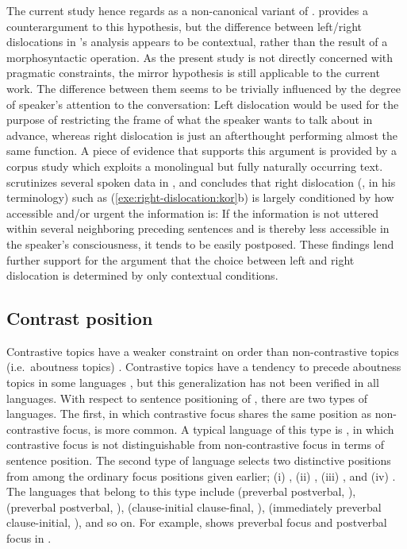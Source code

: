The current study hence regards  as a
non-canonical variant of .  \citet{lambrecht:96}
provides a counterargument to this hypothesis, but the difference
between left/right dislocations in \citeauthor{lambrecht:96}'s
analysis appears to be contextual, rather than the result of a
morphosyntactic operation. As the present study is not directly
concerned with pragmatic constraints, the mirror hypothesis is still
applicable to the current work. The difference between them seems to
be trivially influenced by the degree of speaker's attention to the
conversation: Left dislocation would be used for the purpose of
restricting the frame of what the speaker wants to talk about in
advance, whereas right dislocation is just an afterthought performing
almost the same function. A piece of evidence that supports this
argument is provided by a corpus study which exploits a monolingual
but fully naturally occurring text. \citet{kim:11} scrutinizes several
spoken data in , and concludes that right dislocation
(, in his terminology) such as
(\ref{exe:right-dislocation:kor}b) is largely conditioned by how
accessible and/or urgent the information is: If the information is not
uttered within several neighboring preceding sentences and is thereby
less accessible in the speaker's consciousness, it tends to be easily
postposed. These findings lend further support for the argument that
the choice between left and right dislocation is determined by only
contextual conditions.



\subsection{Contrast position}
\label{4:ssec:contrast-position}


Contrastive topics have a weaker constraint on order than
non-contrastive topics (i.e.\ aboutness topics)
\citep{erteschik:07,bianchi:frascarelli:10}. Contrastive topics have a
tendency to precede aboutness topics in some languages
\citep{bianchi:frascarelli:10}, but this generalization has not been
verified in all languages.  With respect to sentence positioning of
, there are two types of languages. The first,
in which contrastive focus shares the same position as non-contrastive
focus, is more common. A typical language of this type is
, in which contrastive focus is not distinguishable from
non-contrastive focus in terms of sentence position. The second type
of language selects two distinctive positions from among the ordinary
focus positions given earlier; (i) , (ii)
, (iii) , and (iv)
. The languages that belong to this type include
 (preverbal \vs postverbal,
\citealt{skopeteas:fanselow:10}),  (preverbal \vs
postverbal, \citealt{ambar:99}),  (clause-initial \vs
clause-final, \citealt{neeleman:titov:09}),  (immediately
preverbal \vs clause-initial, \citealt{nichols:11}), and so on.  For
example,  shows preverbal focus and postverbal
focus in .

